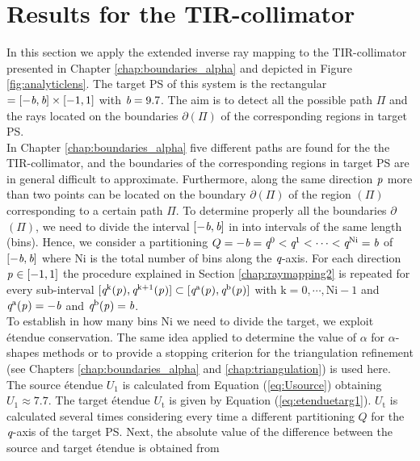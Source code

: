 \section{Results for the TIR-collimator}\label{sec:TIR}
In this section we apply the extended inverse ray mapping to the TIR-collimator presented in Chapter \ref{chap:boundaries_alpha} and depicted in Figure \ref{fig:analyticlens}. The target PS of this system is the rectangular $= [-\textit{b}, \textit{b}]\times[-1,1]$ with $\textit{b}=9.7$. The aim is to detect all the possible path $\Pi$ and the rays located on the boundaries $\partial$$(\Pi)$ of the corresponding regions in target PS. 
\\ \indent In Chapter \ref{chap:boundaries_alpha} five different paths are found for the the TIR-collimator, and the boundaries of the corresponding regions in target PS  are in general difficult to approximate. Furthermore, along the same direction $\textit{p}_{\textrm{} \textit{}}$ more than two points can be located on the boundary $\partial$$(\Pi)$ of the region $(\Pi)$ corresponding to a certain path $\Pi$. To determine properly all the boundaries 
$\partial$$(\Pi)$, we need to divide the interval $[-\textit{b}, \textit{b}]$ in 
 into intervals of the same length (bins). Hence, we consider a partitioning 
$Q = -\textit{b}=\textit{q}^{0}<\textit{q}^{1}<\cdots<\textit{q}^{\textrm{Ni}}=\textit{b}$ of $[-\textit{b}, \textit{b}]$ where $\textrm{Ni}$ is the total number of bins along the $\textit{q}$-axis.
For each direction $\textit{p}_{\textrm{} \textit{}}\in [-1,1]$ the procedure explained in Section \ref{chap:raymapping2} is repeated for every sub-interval $[\textit{q}^{\textrm{k}}(\textit{p}_{\textrm{} \textit{}}), \textit{q}^{\textrm{k}+1}(\textit{p}_{\textrm{} \textit{}})]\subset [\textit{q}^{\textrm{a}}(\textit{p}_{\textrm{} \textit{}}), \textit{q}^{\textrm{b}}(\textit{p}_{\textrm{} \textit{}})]$ with $\textrm{k}=0, \cdots, \textrm{Ni}-1$ and $\textit{q}^{\textrm{a}}(\textit{p}_{\textrm{} \textit{}}) = -\textit{b}$ and $\textit{q}^{\textrm{b}}(\textit{p}_{\textrm{} \textit{}}) = \textit{b}$.\\ \indent
To establish in how many bins \textrm{Ni} we need to divide the target, we exploit \'{e}tendue conservation. The same idea applied to determine the value of $\alpha$ for $\alpha$-shapes methods or to provide a stopping criterion for the triangulation refinement (see Chapters \ref{chap:boundaries_alpha} and \ref{chap:triangulation}) is used here. 
The source \'{e}tendue $U_1$ is calculated from Equation (\ref{eq:Usource}) obtaining $U_1 \approx 7.7$. The target \'{e}tendue $U_\textrm{t}$ is given by Equation (\ref{eq:etenduetarg1}). $U_\textrm{t}$ is calculated several times considering every time a different partitioning $Q$ for the $\textit{q}$-axis of the target PS. Next, the absolute value of the difference between the source and target \'{e}tendue is obtained from

